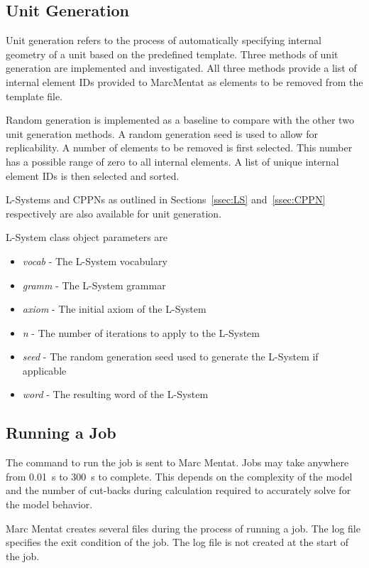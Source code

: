 \subsection{Unit Generation}
\label{ssec:ug}

Unit generation refers to the process of automatically specifying internal geometry of a unit based on the predefined template. Three methods of unit generation are implemented and investigated. All three methods provide a list of internal element IDs provided to MarcMentat as elements to be removed from the template file.

Random generation is implemented as a baseline to compare with the other two unit generation methods. A random generation seed is used to allow for replicability. A number of elements to be removed is first selected. This number has a possible range of zero to all internal elements. A list of unique internal element IDs is then selected and sorted.

L-Systems and CPPNs as outlined in Sections~\ref{ssec:LS} and~\ref{ssec:CPPN} respectively are also available for unit generation.

L-System class object parameters are

\begin{itemize}
	\item \textit{vocab} - The L-System vocabulary
	\item \textit{gramm} - The L-System grammar
	\item \textit{axiom} - The initial axiom of the L-System
	\item \textit{n} - The number of iterations to apply to the L-System
	\item \textit{seed} - The random generation seed used to generate the L-System if applicable
	\item \textit{word} - The resulting word of the L-System
\end{itemize}

\subsection{Running a Job}
\label{ssec:run}

The command to run the job is sent to Marc Mentat. Jobs may take anywhere from \SI{0.01}{\second} to \SI{300}{\second} to complete. This depends on the complexity of the model and the number of cut-backs during calculation required to accurately solve for the model behavior.

Marc Mentat creates several files during the process of running a job. The log file specifies the exit condition of the job. The log file is not created at the start of the job.


